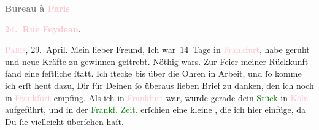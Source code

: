            \pstart
           \begin{otherlanguage}{french}\textcolor{gray}{\textbf{\textbf{Bureau à \textcolor{pink}{Paris}{}\ledrightnote{\textcolor{pink}{Paris}}}}}\end{otherlanguage}\pend
           \pstart
           \begin{otherlanguage}{french}\textcolor{gray}{\textbf{\textbf{\textcolor{pink}{24. Rue Feydeau}{}\ledrightnote{\textcolor{pink}{rue Feydeau}}.}}}\end{otherlanguage}\hfill \textsc{\textcolor{pink}{Paris}{}\ledrightnote{\textcolor{pink}{Paris}}}, 29. April.\pend
           \pstart\center{}Mein lieber Freund,\pend\pstart
           Ich war 14 Tage in \textcolor{pink}{Frankfurt}{}\ledrightnote{\textcolor{pink}{Frankfurt am Main}}, habe geruht und
               neue Kräfte zu gewinnen geſtrebt. Nöthig wars. Zur Feier meiner Rückkunft fand eine
               feſtliche \label{K_L02772-1v}\label{K_L02772-1h} ſtatt. Ich ſtecke bis über die
               Ohren in Arbeit, und ſo komme ich erſt heut dazu, Dir
               für Deinen ſo überaus lieben Brief zu danken, den ich noch in \textcolor{pink}{Frankfurt}{}\ledrightnote{\textcolor{pink}{Frankfurt am Main}} empfing. Als ich in \textcolor{pink}{Frankfurt}{}\ledrightnote{\textcolor{pink}{Frankfurt am Main}} war, wurde gerade dein \textcolor{green}{Stück}{} in \textcolor{pink}{Köln}{}\ledrightnote{\textcolor{pink}{Köln}} aufgeführt,
               und in der {\pb}\textcolor{green}{Frankf. Zeit.}{}\ledrightnote{\textcolor{green}{Frankfurter Zeitung}} erſchien eine kleine \label{K_L02772-2v}\label{K_L02772-2h}, die ich hier
               einfüge, da Du ſie vielleicht überſehen haſt.\pend
           {\bigskip}\pstart
